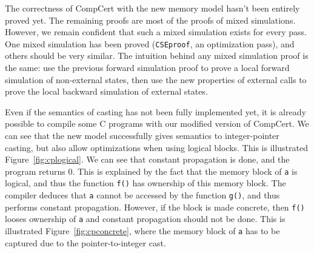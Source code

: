 The correctness of CompCert with the new memory model hasn't been entirely proved yet.
The remaining proofs are most of the proofs of mixed simulations.
However, we remain confident that such a mixed simulation exists for every pass. One mixed simulation has been proved (\texttt{CSEproof}, an optimization pass), and others should be very similar. The intuition behind any mixed simulation proof is the same: use the previous forward simulation proof to prove a local forward simulation of non-external states, then use the new properties of external calls to prove the local backward simulation of external states.

Even if the semantics of casting has not been fully implemented yet, it is already possible to compile some C programs with our modified version of CompCert. We can see that the new model successfully gives semantics to integer-pointer casting, but also allow optimizations when using logical blocks.
This is illustrated Figure~\ref{fig:cplogical}. We can see that constant propagation is done, and the program returns 0. This is explained by the fact that the memory block of \texttt{a} is logical, and thus the function \texttt{f()} has ownership of this memory block. The compiler deduces that \texttt{a} cannot be accessed by the function \texttt{g()}, and thus performs constant propagation.
However, if the block is made concrete, then \texttt{f()} looses ownership of \texttt{a} and constant propagation should not be done. This is illustrated Figure~\ref{fig:cpconcrete}, where the memory block of \texttt{a} has to be captured due to the pointer-to-integer cast.


